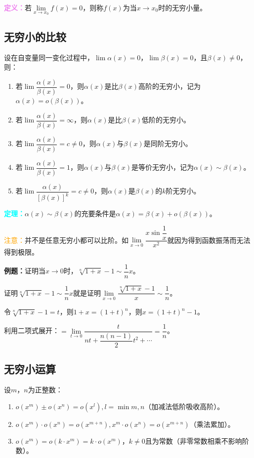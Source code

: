 \documentclass[UTF8, 12pt]{ctexart}
\begin{document}
    \textcolor{violet}{\textbf{定义：}}若$\lim\limits_{x\to x_0}f(x)=0$，则称$f(x)$为当$x\to x_0$时的无穷小量。

    \subsection{无穷小的比较}

    设在自变量同一变化过程中，$\lim\alpha(x)=0$，$\lim\beta(x)=0$，且$\beta(x)\neq 0$，则：

    \begin{enumerate}
        \item 若$\lim\dfrac{\alpha(x)}{\beta(x)}=0$，则$\alpha(x)$是比$\beta(x)$高阶的无穷小，记为$\alpha(x)=o(\beta(x))$。
        \item 若$\lim\dfrac{\alpha(x)}{\beta(x)}=\infty$，则$\alpha(x)$是比$\beta(x)$低阶的无穷小。
        \item 若$\lim\dfrac{\alpha(x)}{\beta(x)}=c\neq 0$，则$\alpha(x)$与$\beta(x)$是同阶无穷小。
        \item 若$\lim\dfrac{\alpha(x)}{\beta(x)}=1$，则$\alpha(x)$与$\beta(x)$是等价无穷小，记为$\alpha(x)\sim\beta(x)$。
        \item 若$\lim\dfrac{\alpha(x)}{[\beta(x)]^k}=c\neq 0$，则$\alpha(x)$是$\beta(x)$的$k$阶无穷小。
    \end{enumerate}

    \textcolor{aqua}{\textbf{定理：}}$\alpha(x)\sim\beta(x)$的充要条件是$\alpha(x)=\beta(x)+o(\beta(x))$。

    \textcolor{orange}{注意：}并不是任意无穷小都可以比阶。如$\lim\limits_{x\to 0}\dfrac{x\sin\dfrac{1}{x}}{x^2}$就因为得到函数振荡而无法得到极限。

    \textbf{例题：}证明当$x\to 0$时，$\sqrt[n]{1+x}-1\sim\dfrac{1}{n}x$。

    证明$\sqrt[n]{1+x}-1\sim\dfrac{1}{n}x$就是证明$\lim\limits_{x\to 0}\dfrac{\sqrt[n]{1+x}-1}{x}\sim\dfrac{1}{n}$。

    令$\sqrt[n]{1+x}-1=t$，则$1+x=(1+t)^n$，则$x=(1+t)^n-1$。

    利用二项式展开：$=\lim\limits_{t\to 0}\dfrac{t}{nt+\dfrac{n(n-1)}{2}t^2+\cdots}=\dfrac{1}{n}$。

    \subsection{无穷小运算}

    设$m$，$n$为正整数：

    \begin{enumerate}
        \item $o(x^m)\pm o(x^n)=o(x^l),l=\min{m,n}$（加减法低阶吸收高阶）。
        \item $o(x^m)\cdot o(x^n)=o(x^{m+n}),x^m\cdot o(x^n)=o(x^{m+n})$（乘法累加）。
        \item $o(x^m)=o(k\cdot x^m)=k\cdot o(x^m)$，$k\neq 0$且为常数（非零常数相乘不影响阶数）。
    \end{enumerate}
\end{document}
